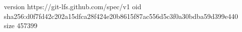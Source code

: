 version https://git-lfs.github.com/spec/v1
oid sha256:d0f7fd42c202a15dfca28f424e20b8615f87ac556d5c3f0a30bdba59d399e440
size 457399
